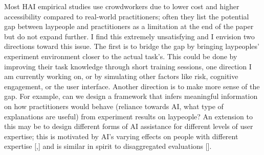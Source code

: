Most HAI empirical studies use crowdworkers due to lower cost and higher accessibility compared to real-world practitioners; often they list the potential gap between laypeople and practitioners as a limitation at the end of the paper but do not expand further. I find this extremely unsatisfying and I envision two directions toward this issue. The first is to bridge the gap by bringing laypeoples' experiment environment closer to the actual task's. This could be done by improving their task knowledge through short training sessions, one direction I am currently working on, or by simulating other factors like risk, cognitive engagement, or the user interface. Another direction is to make more sense of the gap. For example, can we design a framework that infers meaningful information on how practitioners would behave (reliance towards AI, what type of explanations are useful) from experiment results on laypeople? An extension to this may be to design different forms of AI assistance for different levels of user expertise; this is motivated by AI's varying effects on people with different expertise [,] and is similar in spirit to disaggregated evaluations [].

















